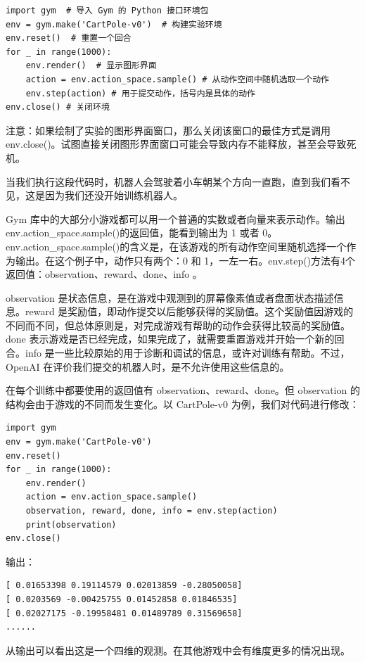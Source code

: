 \begin{lstlisting}[style=Python]
import gym  # 导入 Gym 的 Python 接口环境包
env = gym.make('CartPole-v0')  # 构建实验环境
env.reset()  # 重置一个回合
for _ in range(1000):
    env.render()  # 显示图形界面
    action = env.action_space.sample() # 从动作空间中随机选取一个动作
    env.step(action) # 用于提交动作，括号内是具体的动作
env.close() # 关闭环境
\end{lstlisting}

注意：如果绘制了实验的图形界面窗口，那么关闭该窗口的最佳方式是调用 env.close()。试图直接关闭图形界面窗口可能会导致内存不能释放，甚至会导致死机。

当我们执行这段代码时，机器人会驾驶着小车朝某个方向一直跑，直到我们看不见，这是因为我们还没开始训练机器人。

Gym 库中的大部分小游戏都可以用一个普通的实数或者向量来表示动作。输出env.action\_space.sample()的返回值，能看到输出为 1 或者 0。env.action\_space.sample()的含义是，在该游戏的所有动作空间里随机选择一个作为输出。在这个例子中，动作只有两个：0 和 1，一左一右。env.step()方法有4个返回值：observation、reward、done、info 。

observation 是状态信息，是在游戏中观测到的屏幕像素值或者盘面状态描述信息。reward 是奖励值，即动作提交以后能够获得的奖励值。这个奖励值因游戏的不同而不同，但总体原则是，对完成游戏有帮助的动作会获得比较高的奖励值。done 表示游戏是否已经完成，如果完成了，就需要重置游戏并开始一个新的回合。info 是一些比较原始的用于诊断和调试的信息，或许对训练有帮助。不过，OpenAI 在评价我们提交的机器人时，是不允许使用这些信息的。

在每个训练中都要使用的返回值有 observation、reward、done。但 observation 的结构会由于游戏的不同而发生变化。以 CartPole-v0 为例，我们对代码进行修改：

\begin{lstlisting}[style=Python]
import gym  
env = gym.make('CartPole-v0')  
env.reset()  
for _ in range(1000):
    env.render()  
    action = env.action_space.sample() 
    observation, reward, done, info = env.step(action)
    print(observation)
env.close()    
\end{lstlisting}


输出：
\begin{lstlisting}[basicstyle=\ttfamily]
[ 0.01653398 0.19114579 0.02013859 -0.28050058]
[ 0.0203569 -0.00425755 0.01452858 0.01846535]
[ 0.02027175 -0.19958481 0.01489789 0.31569658] 
......
\end{lstlisting}

从输出可以看出这是一个四维的观测。在其他游戏中会有维度更多的情况出现。

